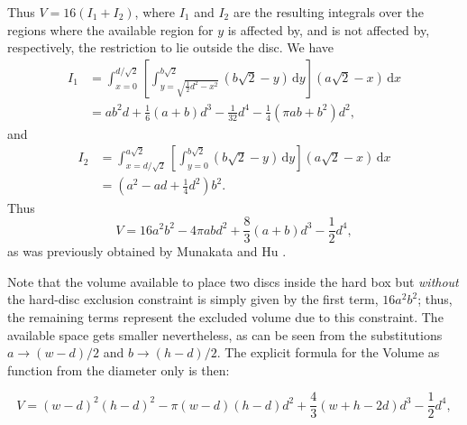 \documentclass[a4paper,10pt, jcp, aps, preprint]{revtex4-1}
\newcommand{\rd}{\, \mathrm{d}}
\begin{document}
Thus $V = 16(I_1 + I_2)$, where $I_1$ and $I_2$ are the resulting integrals over the regions where the available region for $y$ is affected by, and is not affected by, respectively, the restriction to lie outside the disc.
We have
\begin{align}
 I_1 &= \int_{x=0}^{d / \sqrt{2}} \left[ \int_{y = \sqrt{\frac{1}{2} {d^2} - x^2}}^{b \sqrt{2}} \left( b \sqrt{2} - y \right) \rd y \right]  \left( a \sqrt{2} - x \right) \rd x \\
&= 	
a b^{2} d + \textstyle \frac{1}{6} (a+b) d^{3} - \frac{1}{32}  d^{4} - \frac{1}{4} {\left(\pi a b + b^{2}\right)} d^{2},
\end{align}
and
\begin{align}
 I_2 &= \int_{x=d / \sqrt{2}}^{a \sqrt{2}} \left[ \int_{y = 0}^{b \sqrt{2}} \left( b \sqrt{2} - y \right) \rd y \right]  \left( a \sqrt{2} - x \right) \rd x \\
&=	
{\left( a^{2} - a d + \textstyle \frac{1}{4}  d^{2}\right)} b^{2}.
\end{align}
Thus 
\begin{equation}\label{volumeabd}
 V %
= 16 a^{2} b^{2}  - 4 \pi a b d^{2} + \textstyle \frac{8}{3} (a+b) d^{3}  - \frac{1}{2} d^{4},
\end{equation}
as was previously obtained by Munakata and Hu \cite{Munakata02}.

Note that the volume available to place two discs inside 
the hard box but \emph{without} the 
 hard-disc exclusion constraint is simply 
given by the first term, $16 a^2 b^2$; 
thus, the remaining terms represent the excluded volume due to this constraint.
The available space gets smaller nevertheless, as can be seen from
the substitutions $a\rightarrow (w-d)/2$ and $b\rightarrow (h-d)/2$.
The explicit formula for the Volume as function from the diameter only is then:

\begin{equation}\label{volumewhd}
 V 
= (w-d)^{2} (h-d)^{2}  - 
 \pi (w-d)(h-d) d^{2} + 
\textstyle \frac{4}{3} (w+h-2d) d^{3}  
- \frac{1}{2} d^{4},
\end{equation}
 
\end{document}
